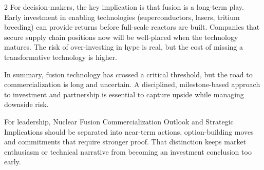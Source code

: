 \documentclass[10pt,a4paper]{article}
\begin{document}
\begin{multicols}{2}
{\small For decision-makers, the key implication is that fusion is a long-term play. Early investment in enabling technologies (superconductors, lasers, tritium breeding) can provide returns before full-scale reactors are built. Companies that secure supply chain positions now will be well-placed when the technology matures. The risk of over-investing in hype is real, but the cost of missing a transformative technology is higher.}\par
{\small In summary, fusion technology has crossed a critical threshold, but the road to commercialization is long and uncertain. A disciplined, milestone-based approach to investment and partnership is essential to capture upside while managing downside risk.}\par
{\small For leadership, Nuclear Fusion Commercialization Outlook and Strategic Implications should be separated into near-term actions, option-building moves and commitments that require stronger proof. That distinction keeps market enthusiasm or technical narrative from becoming an investment conclusion too early.}\par
\end{multicols}
\label{chap:1:end}
\end{document}
